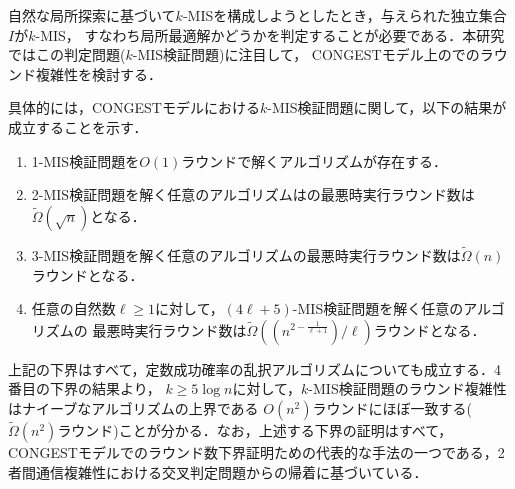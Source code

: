 \documentclass[12pt]{thesis}
\newcommand{\CONGEST}{\textsf{CONGEST}}
\theoremstyle{definition}
\begin{document}
自然な局所探索に基づいて$k$-MISを構成しようとしたとき，与えられた独立集合$I$が$k$-MIS，
すなわち局所最適解かどうかを判定することが必要である．本研究ではこの判定問題($k$-MIS検証問題)に注目して，
{\CONGEST}モデル上のでのラウンド複雑性を検討する．

具体的には，{\CONGEST}モデルにおける$k$-MIS検証問題に関して，以下の結果が成立することを示す．
\begin{enumerate}
\item 1-MIS検証問題を$O(1)$ラウンドで解くアルゴリズムが存在する．
\item 2-MIS検証問題を解く任意のアルゴリズムはの最悪時実行ラウンド数は$\tilde{\Omega} (\sqrt{n})$となる．
\item 3-MIS検証問題を解く任意のアルゴリズムの最悪時実行ラウンド数は$\tilde{\Omega}(n)$ラウンドとなる．
\item 任意の自然数$\ell \geq 1$に対して，$(4\ell + 5)$-MIS検証問題を解く任意のアルゴリズムの
最悪時実行ラウンド数は$\tilde{\Omega}\left((n^{2 - \frac{1}{\ell+1}})/\ell\right)$ラウンドとなる．
\end{enumerate}

上記の下界はすべて，定数成功確率の乱択アルゴリズムについても成立する．4番目の下界の結果より，
$k\geq 5\log n$に対して，$k$-MIS検証問題のラウンド複雑性はナイーブなアルゴリズムの上界である
$O(n^2)$ラウンドにほぼ一致する($\tilde{\Omega}(n^2)$ラウンド)ことが分かる．なお，上述する下界の証明はすべて，
{\CONGEST}モデルでのラウンド数下界証明ための代表的な手法の一つである，2者間通信複雑性における交叉判定問題からの帰着に基づいている．
\end{document}
